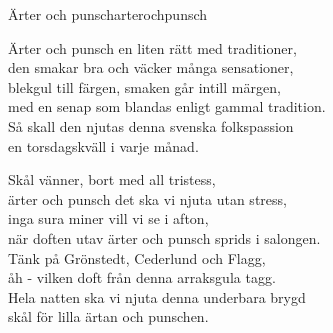 \begin{song}{Ärter och punsch}{arterochpunsch}
\begin{vers}
Ärter och punsch en liten rätt med traditioner,\\
den smakar bra och väcker många sensationer,\\
blekgul till färgen, smaken går intill märgen,\\
med en senap som blandas enligt gammal tradition.\\
Så skall den njutas denna svenska folkspassion\\
en torsdagskväll i varje månad.\\
\end{vers}
\begin{vers}
Skål vänner, bort med all tristess,\\
ärter och punsch det ska vi njuta utan stress,\\
inga sura miner vill vi se i afton,\\
när doften utav ärter och punsch sprids i salongen.\\
Tänk på Grönstedt, Cederlund och Flagg,\\
åh - vilken doft från denna arraksgula tagg.\\
Hela natten ska vi njuta denna underbara brygd\\
skål för lilla ärtan och punschen.\\
\end{vers}
\end{song}
